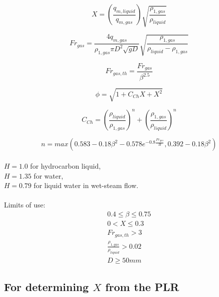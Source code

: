 \documentclass[journal]{IEEEtran}
\begin{document}
\begin{equation}
    X = \left( \frac{q_{m,liquid}}{q_{m,gas}} \right)\sqrt{\frac{\rho_{1,gas}}{\rho_{liquid}}}
\end{equation}

\begin{equation}
    Fr_{gas} = \frac{4q_{m,gas}}{\rho_{1,gas} \pi D^{2} \sqrt{gD}} \sqrt{\frac{\rho_{1,gas}}{\rho_{liquid}-\rho_{1,gas}}}
\end{equation}

\begin{equation}
    Fr_{gas,th} = \frac{Fr_{gas}}{\beta ^{2.5}}
\end{equation}

\begin{equation}
    \phi = \sqrt{1+C_{Ch}X+X^2}
\end{equation}

\begin{equation}
    C_{Ch} = \left( \frac{\rho_{liquid}}{\rho_{1,gas}} \right) ^{n} +\left( \frac{\rho_{1,gas}}{\rho_{liquid}} \right) ^{n}
\end{equation}

\begin{equation}
    n = max \left( 0.583 - 0.18 \beta^{2} - 0.578 e^{-0.8 \frac{Fr_{gas}}{H}}, 0.392 - 0.18 \beta^{2} \right)
\end{equation}
\\
$H = 1.0$ for hydrocarbon liquid,\\
$H = 1.35$ for water,\\
$H = 0.79$ for liquid water in wet-steam flow.
\\
\\
Limits of use: \\
\begin{equation*}
\begin{aligned}
    0.4 \leq \beta \leq 0.75 \\
    0 < X \leq 0.3 \\
    Fr_{gas,th} > 3 \\
    \frac{\rho_{1,gas}}{\rho_{liquid}} > 0.02 \\
    D \geq 50 mm
\end{aligned}
\end{equation*}



\subsection{For determining $X$ from the \acrshort{PLR}}
\end{document}
